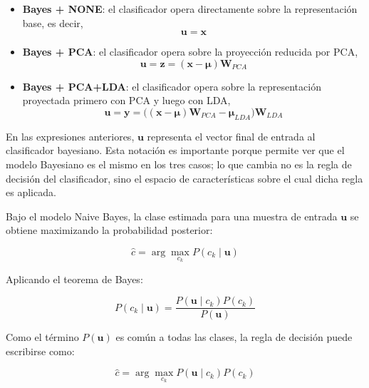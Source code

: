 \documentclass[11pt, a4paper]{article}
\begin{document}
\begin{itemize}
    \item \textbf{Bayes + NONE}: el clasificador opera directamente sobre la representación base, es decir,
    \begin{equation}
    \mathbf{u} = \mathbf{x}
    \end{equation}

    \item \textbf{Bayes + PCA}: el clasificador opera sobre la proyección reducida por PCA,
    \begin{equation}
    \mathbf{u} = \mathbf{z} = (\mathbf{x} - \boldsymbol{\mu})\mathbf{W}_{PCA}
    \end{equation}

    \item \textbf{Bayes + PCA+LDA}: el clasificador opera sobre la representación proyectada primero con PCA y luego con LDA,
    \begin{equation}
    \mathbf{u} = \mathbf{y} = \big((\mathbf{x} - \boldsymbol{\mu})\mathbf{W}_{PCA} - \boldsymbol{\mu}_{LDA}\big)\mathbf{W}_{LDA}
    \end{equation}
\end{itemize}

En las expresiones anteriores, $\mathbf{u}$ representa el vector final de entrada al clasificador bayesiano. Esta notación es importante porque permite ver que el modelo Bayesiano es el mismo en los tres casos; lo que cambia no es la regla de decisión del clasificador, sino el espacio de características sobre el cual dicha regla es aplicada.

Bajo el modelo Naive Bayes, la clase estimada para una muestra de entrada $\mathbf{u}$ se obtiene maximizando la probabilidad posterior:

\begin{equation}
\hat{c} = \arg\max_{c_k} P(c_k \mid \mathbf{u})
\end{equation}

Aplicando el teorema de Bayes:

\begin{equation}
P(c_k \mid \mathbf{u}) = \frac{P(\mathbf{u} \mid c_k)P(c_k)}{P(\mathbf{u})}
\end{equation}

Como el término $P(\mathbf{u})$ es común a todas las clases, la regla de decisión puede escribirse como:

\begin{equation}
\hat{c} = \arg\max_{c_k} P(\mathbf{u} \mid c_k)P(c_k)
\end{equation}
\end{document}

